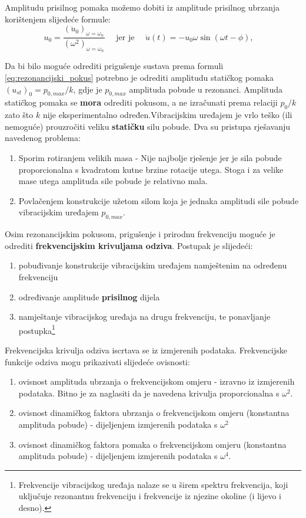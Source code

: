 Amplitudu prisilnog pomaka možemo dobiti iz amplitude prisilnog ubrzanja korištenjem
slijedeće formule:
\begin{equation}
    u_0=\frac{(\ddot{u}_0)_{\omega=\omega_n}}{(\omega^2)_{\omega=\omega_n}} \quad
    \text{ jer je } \quad
    \ddot{u}(t) = -u_0\omega\sin(\omega t -\phi), \quad
\end{equation}

Da bi bilo moguće odrediti prigušenje sustava prema formuli \eqref{eq:rezonancijski_pokus} 
potrebno je odrediti amplitudu statičkog pomaka $(u_{st})_0=p_{0,max}/k$, gdje je
$p_{0,max}$ amplituda pobude u rezonanci. Amplituda statičkog pomaka se
\textbf{mora} odrediti pokusom, a ne izračunati prema relaciji $p_0/k$ zato što $k$
nije eksperimentalno određen.Vibracijskim uređajem je vrlo teško (ili
nemoguće) prouzročiti veliku \textbf{statičku} silu pobude. Dva su pristupa rješavanju
navedenog problema:
\begin{enumerate}
    \item Sporim rotiranjem velikih masa - Nije najbolje rješenje jer je sila pobude
        proporcionalna s kvadratom kutne brzine rotacije utega. Stoga i za velike mase 
        utega amplituda sile pobude je relativno mala.
    \item Povlačenjem konstrukcije užetom silom koja je jednaka amplitudi sile
        pobude vibracijskim uređajem $p_{0,max}$.
\end{enumerate}

Osim rezonancijskim pokusom, prigušenje i prirodnu frekvenciju moguće je
odrediti \textbf{frekvencijskim krivuljama odziva}. Postupak je slijedeći:
\begin{enumerate}
    \item pobuđivanje konstrukcije vibracijskim uređajem namještenim na određenu
        frekvenciju
    \item određivanje amplitude \textbf{prisilnog} dijela 
    \item namještanje vibracijskog uređaja na drugu frekvenciju, te ponavljanje
        postupka\footnote{Frekvencije vibracijskog uređaja nalaze se u širem spektru 
        frekvencija, koji uključuje rezonantnu frekvenciju i frekvencije iz njezine 
        okoline (i lijevo i desno).} 
\end{enumerate}

Frekvencijska krivulja odziva iscrtava se iz izmjerenih podataka. Frekvencijske
funkcije odziva mogu prikazivati slijedeće ovisnosti:
\begin{enumerate}
    \item ovisnost amplituda ubrzanja o frekvencijskom omjeru - izravno iz
        izmjerenih podataka. Bitno je za naglasiti da je navedena krivulja
        proporcionalna s $\omega^2$.

    \item ovisnost dinamičkog faktora ubrzanja o frekvencijskom omjeru (konstantna
        amplituda pobude) - dijeljenjem izmjerenih podataka s $\omega^2$ 

    \item ovisnost dinamičkog faktora pomaka o frekvencijskom omjeru (konstantna
        amplituda pobude) - dijeljenjem izmjerenih podataka s $\omega^4$.
\end{enumerate}

